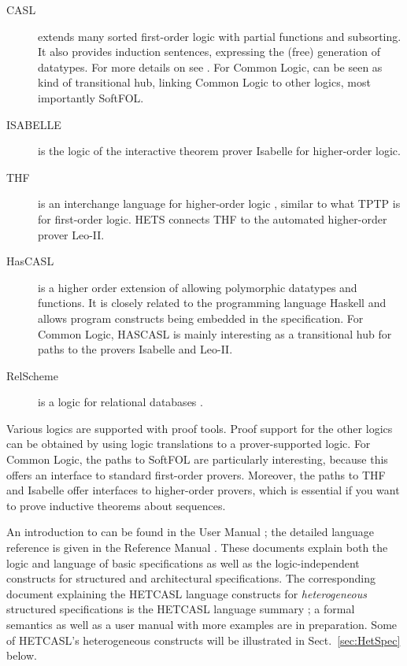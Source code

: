 \documentclass{article}
\newcommand{\normalTEXTSC}[2]{{#1\scriptsize#2}}
\newcommand     {\Hets}{\normalTEXTSC{H}{ETS}\xspace}
\newcommand     {\Isabelle}{\normalTEXTSC{I}{SABELLE}\xspace}
\newcommand     {\HasCASL}{\normalTEXTSC{H}{AS}\normalTEXTSC{C}{ASL}\xspace}
\newcommand{\HetCASL}{\normalTEXTSC{H}{ET}\normalTEXTSC{C}{ASL}\xspace}
\begin{document}
\begin{description}
\item[CASL] extends many sorted first-order logic with partial
  functions and subsorting.  It also provides induction sentences,
  expressing the (free) generation of datatypes.
For more details on \CASL see \cite{CASL/RefManual,CASL-UM}.
For Common Logic, \CASL can be seen as kind of transitional hub, linking
Common Logic to other logics, most importantly SoftFOL.

\item[\Isabelle] \cite{NipPauWen02} is the logic of the interactive
  theorem prover Isabelle for higher-order logic.

\item[THF] is an interchange language for higher-order logic
  \cite{DBLP:conf/cade/BenzmullerRS08}, similar to what TPTP
  is for first-order logic. \Hets connects THF to the automated
  higher-order prover Leo-II.

\item[HasCASL] is a higher order extension of \CASL allowing
  polymorphic datatypes and functions. It is closely related to the
  programming language Haskell and allows program constructs being
  embedded in the specification. For Common Logic, \HasCASL
  is mainly interesting as a transitional hub for paths
  to the provers Isabelle and Leo-II.

\item[RelScheme] is a logic for relational databases \cite{DBLP:journals/ao/SchorlemmerK08}.

\end{description}

Various logics are supported with proof tools. Proof support for the
other logics can be obtained by using logic translations to a
prover-supported logic. For Common Logic, the paths to SoftFOL
are particularly interesting, because this offers an interface
to standard first-order provers. Moreover, the paths to THF
and Isabelle offer interfaces to higher-order provers, which
is essential if you want to prove inductive theorems about
sequences.


An introduction to \CASL can be found in the \CASL User Manual
\cite{CASL-UM}; the detailed language reference is given in
the \CASL Reference Manual \cite{CASL/RefManual}.  These documents
explain both the \CASL logic and language of basic specifications as
well as the logic-independent constructs for structured and
architectural specifications.  The corresponding document explaining the
\HetCASL language constructs for \emph{heterogeneous} structured specifications
is the \HetCASL language summary \cite{Mossakowski04}; a formal
semantics as well as a user manual with more examples are in preparation.
Some of \HetCASL's heterogeneous constructs will be illustrated
in Sect.~\ref{sec:HetSpec} below.\\
\end{document}
